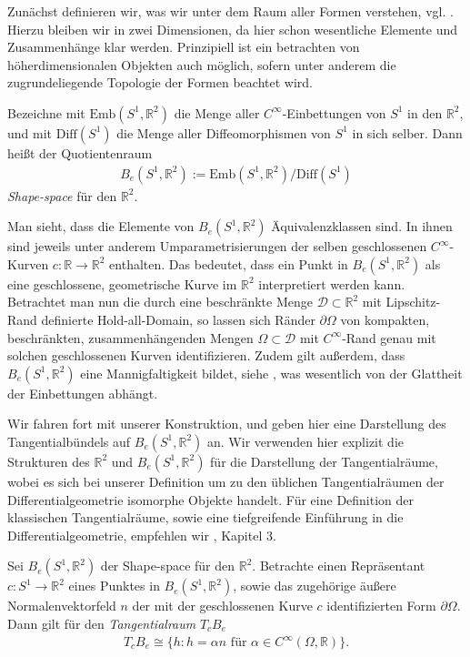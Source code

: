 Zunächst definieren wir, was wir unter dem Raum aller Formen verstehen, vgl. \cite{bfgs1}. Hierzu bleiben wir in zwei Dimensionen, da hier schon wesentliche Elemente und Zusammenhänge klar werden. Prinzipiell ist ein betrachten von höherdimensionalen Objekten auch möglich, sofern unter anderem die zugrundeliegende Topologie der Formen beachtet wird.

\begin{defi}
Bezeichne mit $\text{Emb}(S^1, \mathbb{R}^2)$ die Menge aller $C^\infty$-Einbettungen von $S^1$ in den $\mathbb{R}^2$, und mit $\text{Diff}(S^1)$ die Menge aller Diffeomorphismen von $S^1$ in sich selber. Dann heißt der Quotientenraum
\begin{align*}
	B_e(S^1,\mathbb{R}^2) := \text{Emb}(S^1, \mathbb{R}^2) / \text{Diff}(S^1)
\end{align*}
\textit{Shape-space} für den $\mathbb{R}^2$.
\end{defi}

Man sieht, dass die Elemente von $B_e(S^1,\mathbb{R}^2)$ Äquivalenzklassen sind. In ihnen sind jeweils unter anderem Umparametrisierungen der selben geschlossenen $C^\infty$-Kurven $c: \mathbb{R} \rightarrow \mathbb{R}^2$ enthalten. Das bedeutet, dass ein Punkt in $B_e(S^1,\mathbb{R}^2)$ als eine geschlossene, geometrische Kurve im $\mathbb{R}^2$ interpretiert werden kann. Betrachtet man nun die durch eine beschränkte Menge $\mathcal{D}\subset\mathbb{R}^2$ mit Lipschitz-Rand definierte Hold-all-Domain, so lassen sich Ränder $\partial\Omega$ von kompakten, beschränkten, zusammenhängenden Mengen $\Omega\subset \mathcal{D}$ mit $C^\infty$-Rand genau mit solchen geschlossenen Kurven identifizieren. Zudem gilt außerdem, dass $B_e(S^1,\mathbb{R}^2)$ eine Mannigfaltigkeit bildet, siehe \cite{bfgs1}, was wesentlich von der Glattheit der Einbettungen abhängt.

Wir fahren fort mit unserer Konstruktion, und geben hier eine Darstellung des Tangentialbündels auf $B_e(S^1,\mathbb{R}^2)$ an. Wir verwenden hier explizit die Strukturen des $\mathbb{R}^2$ und $B_e(S^1,\mathbb{R}^2)$ für die Darstellung der Tangentialräume, wobei es sich bei unserer Definition um zu den üblichen Tangentialräumen der Differentialgeometrie isomorphe Objekte handelt. Für eine Definition der klassischen Tangentialräume, sowie eine tiefgreifende Einführung in die Differentialgeometrie, empfehlen wir \cite{LeeDGEO}, Kapitel 3.

\begin{defi}[Tangentialbündel]\label{Tangentialvektor}
Sei $B_e(S^1, \mathbb{R}^2)$ der Shape-space für den $\mathbb{R}^2$. Betrachte einen Repräsentant $c: S^1 \rightarrow \mathbb{R}^2$ eines Punktes in $B_e(S^1, \mathbb{R}^2)$, sowie das zugehörige äußere Normalenvektorfeld $n$ der mit der geschlossenen Kurve $c$ identifizierten Form $\partial\Omega$. Dann gilt für den \textit{Tangentialraum} $T_cB_e$
\begin{align*}
	T_cB_e \cong \{h : h = \alpha n \text{ für } \alpha \in C^\infty(\Omega,\mathbb{R})\}.
\end{align*}

\end{defi}

